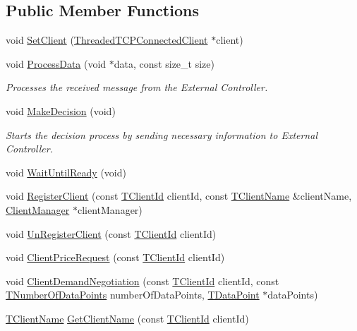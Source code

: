 \subsection*{Public Member Functions}
\begin{DoxyCompactItemize}
\item 
void \hyperlink{class_control_manager_a67d548535b36a78e315a0aa5f9f8e6c8}{Set\-Client} (\hyperlink{class_threaded_t_c_p_connected_client}{Threaded\-T\-C\-P\-Connected\-Client} $\ast$client)
\item 
void \hyperlink{class_control_manager_a2dc55da1b01fd175b3d885c68b8a7524}{Process\-Data} (void $\ast$data, const size\-\_\-t size)
\begin{DoxyCompactList}\small\item\em Processes the received message from the External Controller. \end{DoxyCompactList}\item 
void \hyperlink{class_control_manager_a0d5212df17307aef87d42add3aa6cc7a}{Make\-Decision} (void)
\begin{DoxyCompactList}\small\item\em Starts the decision process by sending necessary information to External Controller. \end{DoxyCompactList}\item 
void \hyperlink{class_control_manager_a4e23ffb481554c26cf99c411dd16ae36}{Wait\-Until\-Ready} (void)
\item 
void \hyperlink{class_control_manager_a56df538a5380c9091123a5a8a5e0fe86}{Register\-Client} (const \hyperlink{class_control_manager_a1bff13cab35db39c43f81f49b56e4849}{T\-Client\-Id} client\-Id, const \hyperlink{class_control_manager_ae9c86c5286c9ebf222ea44b60c463872}{T\-Client\-Name} \&client\-Name, \hyperlink{class_client_manager}{Client\-Manager} $\ast$client\-Manager)
\item 
void \hyperlink{class_control_manager_ac3c913a01fe2e5e5467ad3d140c8e9a2}{Un\-Register\-Client} (const \hyperlink{class_control_manager_a1bff13cab35db39c43f81f49b56e4849}{T\-Client\-Id} client\-Id)
\item 
void \hyperlink{class_control_manager_aa4398a05586d9b711aa6101334deefe1}{Client\-Price\-Request} (const \hyperlink{class_control_manager_a1bff13cab35db39c43f81f49b56e4849}{T\-Client\-Id} client\-Id)
\item 
void \hyperlink{class_control_manager_a5b551f560431d0bb0bcf6c338bac8eb3}{Client\-Demand\-Negotiation} (const \hyperlink{class_control_manager_a1bff13cab35db39c43f81f49b56e4849}{T\-Client\-Id} client\-Id, const \hyperlink{class_control_manager_a90ca5d46699df9c6e67c96e36727eff1}{T\-Number\-Of\-Data\-Points} number\-Of\-Data\-Points, \hyperlink{class_control_manager_a236ef5279ad4f3082443e4c6d300a7d2}{T\-Data\-Point} $\ast$data\-Points)
\item 
\hyperlink{class_control_manager_ae9c86c5286c9ebf222ea44b60c463872}{T\-Client\-Name} \hyperlink{class_control_manager_a927449c3a4ba8a5bdc23e3747d5bb077}{Get\-Client\-Name} (const \hyperlink{class_control_manager_a1bff13cab35db39c43f81f49b56e4849}{T\-Client\-Id} client\-Id)
\end{DoxyCompactItemize}
